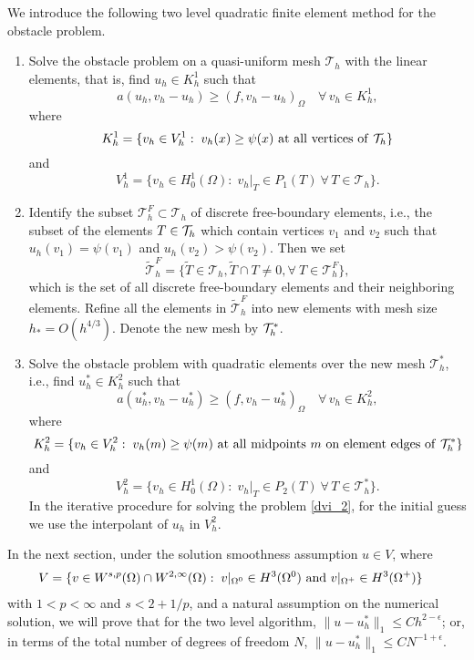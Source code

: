 \documentclass[12pt]{article}
\begin{document}
We introduce the following two level quadratic finite element method for the obstacle problem.
\begin{enumerate}
\item Solve the obstacle problem on a quasi-uniform mesh $\mathcal{T}_h$ with the linear elements, 
that is, find $u_h \in K_h^1$ such that
\begin{equation}\label{dvi_1}
a(u_h,v_h-u_h) \geq (f,v_h-u_h)_\Omega \quad\forall\,v_h \in K_h^1,
\end{equation}
where
\[ K_h^1 = \{ v_h \in V_h^1: \; v_h(x) \geq \psi(x)\ {\rm at\ all\ vertices\ of}\ \mathcal{T}_h\} \]
and 
\[ V_h^1 =\{v_h \in H_0^1(\Omega): \;v_h |_T \in P_1(T)\ \forall\,T\in\mathcal{T}_h   \}. \]
\item Identify the subset $\mathcal{T}_h^F\subset\mathcal{T}_h$ of discrete free-boundary elements, 
i.e., the subset of the elements $T\in{\cal T}_h$ {\color{red} which contain vertices
  $v_1$ and $v_2$ such that $u_h(v_1)=\psi(v_1)$ and
  $u_h(v_2)>\psi(v_2)$. Then we set 
  $$
  \tilde{\mathcal{T}}_h^F = \{\tilde{T}\in\mathcal{T}_h, \tilde{T}\cap T \neq 0, \forall \ T \in \mathcal{T}_h^F\},
  $$
which is the set of all discrete free-boundary elements and their neighboring elements.}
Refine all the elements in $\tilde{\mathcal{T}}_h^F$ into new elements 
with mesh size $h_*=O(h^{4/3})$.  Denote the new mesh by ${\cal T}_h^*$.
\item Solve the obstacle problem with quadratic elements over the new mesh $\mathcal{T}_h^*$, 
i.e., find $u_h^* \in K_h^2$ such that
\begin{equation}\label{dvi_2}
a(u_h^*,v_h-u^*_h) \geq (f,v_h-u^*_h)_\Omega \quad\forall\,v_h \in K_h^2,
\end{equation}
where
\[ K_h^2 = \{ v_h \in V_h^2: \; v_h(m) \geq \psi(m)\ {\rm at\ all\
midpoints}\ m\ {\rm on\ element \ edges\ of}\ \mathcal{T}_h^*\} \]
and
\[ V_h^2=\{v_h \in H_0^1(\Omega): \;v_h |_T \in P_2(T)\ \forall\,T\in\mathcal{T}_h^*  \}. \]
In the iterative procedure for solving the problem \eqref{dvi_2}, for the initial guess 
we use the interpolant of $u_h$ in $V_h^2$.
\end{enumerate}

In the next section, under the solution smoothness assumption $u\in V$, where  
\begin{align}
V&=\{v\in W^{s,p}(\Omega)\cap W^{2,\infty}(\Omega):\; v|_{\Omega^0}\in H^3(\Omega^0)
 \ {\rm and}\ v|_{\Omega^+}\in H^3(\Omega^+)\}\label{regularity}
\end{align}
with $1<p<\infty$ and $s<2+1/p$, and a natural assumption on the numerical solution, we will prove 
that for the two level algorithm, $\|u-u^*_h\|_1\leq C h^{2-\epsilon}$; or, in terms
of the total number of degrees of freedom $N$, $\|u-u^*_h\|_1\leq C N^{-1+\epsilon}$.
\end{document}
